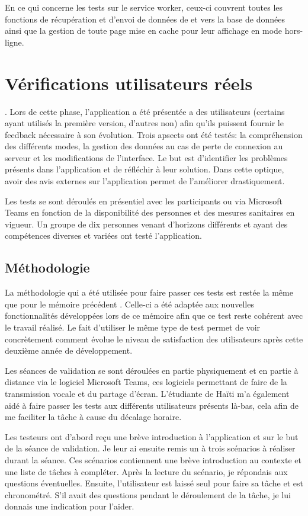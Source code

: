 \documentclass{EPL-master-thesis-covers-FR}
\begin{document}
			En ce qui concerne les tests sur le service worker, ceux-ci couvrent toutes les fonctions de récupération et d'envoi de données de et vers la base de données ainsi que la gestion de toute page mise en cache pour leur affichage en mode hors-ligne.

		\section{Vérifications utilisateurs réels}
.			Lors de cette phase, l'application a été présentée a des utilisateurs (certains ayant utilisés la première version, d'autres non) afin qu'ils puissent fournir le feedback nécessaire à son évolution. Trois apsects ont été testés: la compréhension des différents modes, la gestion des données au cas de perte de connexion au serveur et les modifications de l'interface. Le but est d'identifier les problèmes présents dans l'application et de réfléchir à leur solution. Dans cette optique, avoir des avis externes sur l'application permet de l'améliorer drastiquement.
			
			Les tests se sont déroulés en présentiel avec les participants ou via Microsoft Teams en fonction de la disponibilité des personnes et des mesures sanitaires en vigueur. Un groupe de dix personnes venant d'horizons différents et ayant des compétences diverses et variées ont testé l'application.


			\subsection*{Méthodologie}
				\label{sec:methodo}
				La méthodologie qui a été utilisée pour faire passer ces tests est restée la même que pour le mémoire précédent \cite{ref:haitiwater}. Celle-ci a été adaptée aux nouvelles fonctionnalités développées lors de ce mémoire afin que ce test reste cohérent avec le travail réalisé. Le fait d'utiliser le même type de test permet de voir concrètement comment évolue le niveau de satisfaction des utilisateurs après cette deuxième année de développement.
				
				Les séances de validation se sont déroulées en partie physiquement et en partie à distance via le logiciel Microsoft Teams, ces logiciels permettant de faire de la transmission vocale et du partage d'écran. L'étudiante de Haïti m'a également aidé à faire passer les tests aux différents utilisateurs présents là-bas, cela afin de me faciliter la tâche à cause du décalage horaire.
				
				Les testeurs ont d'abord reçu une brève introduction à l'application et sur le but de la séance de validation. Je leur ai ensuite remis un à trois scénarios à réaliser durant la séance. Ces scénarios contiennent une brève introduction au contexte et une liste de tâches à compléter. Après la lecture du scénario,
je répondais aux questions éventuelles. Ensuite, l'utilisateur est laissé seul pour faire sa tâche et est chronométré. S'il avait des questions pendant le déroulement de la tâche, je lui donnais une indication pour l'aider.
				
\end{document}
